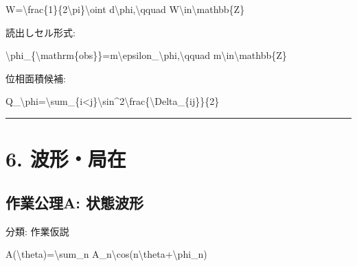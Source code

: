 \documentclass[
  a4paper]{ltjsarticle}
\newenvironment{Shaded}{}{}
\newcommand{\NormalTok}[1]{#1}
\begin{document}
\begin{Shaded}
\begin{Highlighting}[]
\NormalTok{W=\textbackslash{}frac\{1\}\{2\textbackslash{}pi\}\textbackslash{}oint d\textbackslash{}phi,\textbackslash{}qquad W\textbackslash{}in\textbackslash{}mathbb\{Z\}}
\end{Highlighting}
\end{Shaded}

読出しセル形式:

\begin{Shaded}
\begin{Highlighting}[]
\NormalTok{\textbackslash{}phi\_\{\textbackslash{}mathrm\{obs\}\}=m\textbackslash{}epsilon\_\textbackslash{}phi,\textbackslash{}qquad m\textbackslash{}in\textbackslash{}mathbb\{Z\}}
\end{Highlighting}
\end{Shaded}

位相面積候補:

\begin{Shaded}
\begin{Highlighting}[]
\NormalTok{Q\_\textbackslash{}phi=\textbackslash{}sum\_\{i\textless{}j\}\textbackslash{}sin\^{}2\textbackslash{}frac\{\textbackslash{}Delta\_\{ij\}\}\{2\}}
\end{Highlighting}
\end{Shaded}

\begin{center}\rule{0.5\linewidth}{0.5pt}\end{center}

\section{6. 波形・局在}\label{ux6ce2ux5f62ux5c40ux5728}

\subsection{作業公理A:
状態波形}\label{ux4f5cux696dux516cux7406a-ux72b6ux614bux6ce2ux5f62}

分類: 作業仮説

\begin{Shaded}
\begin{Highlighting}[]
\NormalTok{A(\textbackslash{}theta)=\textbackslash{}sum\_n A\_n\textbackslash{}cos(n\textbackslash{}theta+\textbackslash{}phi\_n)}
\end{Highlighting}
\end{Shaded}
\end{document}
